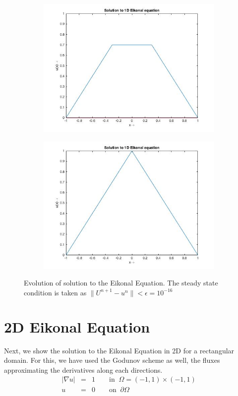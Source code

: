 \begin{figure}[h!]
\begin{subfigure}{0.5\textwidth}
			\includegraphics[scale = 0.4]{Images/1deik/7.jpg}
	\end{subfigure}
	\begin{subfigure}{0.5\textwidth}
			\includegraphics[scale = 0.4]{Images/1deik/21.jpg}
	\end{subfigure}
	\caption{Evolution of solution to the Eikonal Equation. The steady state condition is taken as $\lVert U^{n+1} - u^{n} \rVert < \epsilon = 10^{-16}$}
	\label{fig:7}
\end{figure}

\pagebreak
\section{2D Eikonal Equation}
Next, we show the solution to the Eikonal Equation in 2D for a rectangular domain. For this, we have used the Godunov scheme as well, the fluxes approximating the derivatives along each directions.
\begin{eqnarray}
	\lvert \nabla u \rvert &=& 1 \qquad \text{in} \;\; \Omega = (-1,1) \times (-1,1)\\
	u &=& 0 \qquad \text{on}\;\;\partial \Omega
\end{eqnarray}

